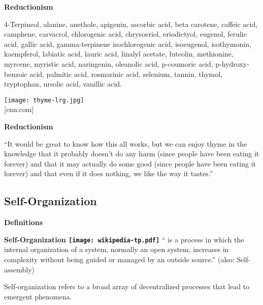 \begin{frame}[plain]
\begin{frame}[plain]
  



  \textbf{Reductionism}

      
    \textbf{}
      4-Terpineol, alanine, anethole, apigenin, ascorbic acid, beta
      carotene, caffeic acid, camphene, carvacrol, chlorogenic acid,
      chrysoeriol, eriodictyol, eugenol, ferulic acid, gallic acid,
      gamma-terpinene isochlorogenic acid, isoeugenol, isothymonin,
      kaempferol, labiatic acid, lauric acid, linalyl acetate, luteolin,
      methionine, myrcene, myristic acid, naringenin, oleanolic acid,
      p-coumoric acid, p-hydroxy-benzoic acid, palmitic acid, rosmarinic
      acid, selenium, tannin, thymol, tryptophan, ursolic acid, vanillic
      acid.
    
    
    \texttt{[image: thyme-lrg.jpg]}\\
    {\mbox{} \hfill \tiny [cnn.com]}
  

  \textbf{Reductionism}

  
  ``It would be great to know how this all works, but  we
  can enjoy thyme in the knowledge that it probably doesn't do any harm
  (since people have been eating it forever) and that it may actually do
  some good (since people have been eating it forever) and that even if
  it does nothing, we like the way it tastes.''

  \bigskip

  {
  }
  


\subsection{Self-Organization}

  \textbf{Definitions}

  \textbf{Self-Organization
      \hfill
      \texttt{[image: wikipedia-tp.pdf]}
    }
    `` is a process in which the internal organization 
    of a system, normally an open system, increases in complexity without 
    being guided or managed by an outside source.''
    (also: Self-assembly)
  

  \medskip

  
    
     
      Self-organization refers to a broad array of decentralized processes 
      that lead to emergent phenomena.
    

\end{frame}
\end{frame}
